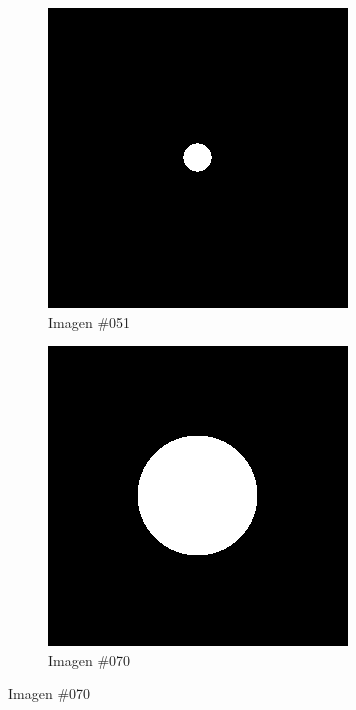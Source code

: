 \begin{figure}
\begin{subfigure}{0.30\textwidth}
		\includegraphics[width=\textwidth]{images/datasets/ImSphRad100/Sphere051.png}
		\caption{Imagen \#051}
		\label{f:implementacion:ImSphRad100:051}
	\end{subfigure}
	\begin{subfigure}{0.30\textwidth}
		\centering
		\includegraphics[width=\textwidth]{images/datasets/ImSphRad100/Sphere070.png}
		\caption{Imagen \#070}
		\label{f:implementacion:ImSphRad100:070}
	\end{subfigure}


\end{figure}
